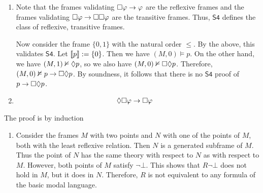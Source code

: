 \documentclass{article}
\begin{document}
\begin{ex}
\begin{enumerate}
\item Note that the frames validating $\square\varphi\to\varphi$ are the reflexive frames and the
frames validating $\square\varphi\to\square\square\varphi$ are the transitive frames. Thus, $\mathsf{S4}$
defines the class of reflexive, transitive frames. 

Now consider the frame $\{0,1\}$ with the natural order $\leq$. By the above, this validates $\mathsf{S4}$. Let $\llbracket p\rrbracket:=\{0\}$. Then we have $(M,0)\models p$. On the other hand, we have $(M,1)\nvDash\lozenge p$, so we also have $(M,0)\nvDash\square\lozenge p$. Therefore, $(M,0)\nvDash p\to\square\lozenge p$. By soundness, it follows
that there is no $\mathsf{S4}$ proof of $p\to\square\lozenge p$.
\item
\begin{align*}
& \lozenge\square\varphi\to\square\varphi
\end{align*} 
\end{enumerate}
\end{ex}

\begin{ex}
The proof is by induction 
\end{ex}

\begin{ex}
\begin{enumerate}
\item Consider the frames $M$ with two points and $N$ with one of the points of $M$, both with the least reflexive relation. Then $N$ is a generated subframe of $M$. Thus the point of $N$ has the same theory with respect to $N$ as with respect to $M$. However, both points of $M$ satisfy $\neg\bot$. This shows that $R\neg\bot$ does not hold in $M$, but it does in $N$. Therefore, $R$ is not equivalent to any formula of the basic modal language.
\end{enumerate}
\end{ex}
\end{document}
